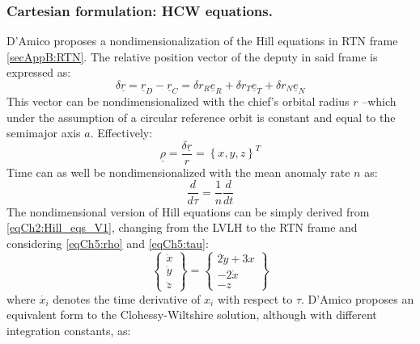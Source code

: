 		\subsubsection{Cartesian formulation: HCW equations.}
		\indent D'Amico proposes a nondimensionalization of the Hill equations in RTN frame \ref{secAppB:RTN}. The relative position vector of the deputy in said frame is expressed as:
		\[
		\delta \underline{r} = \underline{r}_D - \underline{r}_C = \delta r_R \underline{e}_R + \delta r_T \underline{e}_T + \delta r_N \underline{e}_N
		\]
		\indent This vector can be nondimensionalized with the chief's orbital radius $r$ --which under the assumption of a circular reference orbit is constant and equal to the semimajor axis $a$. Effectively:
		\begin{equation}
		\underline{\rho} = \dfrac{\delta \underline{r}}{r} = \left\{ x, y, z\right\}^T
		\label{eqCh5:rho}
		\end{equation}
		\indent Time can as well be nondimensionalized with the mean anomaly rate $n$ as:
		\begin{equation}
		\dfrac{d}{d\tau} = \dfrac{1}{n} \dfrac{d}{dt} 
		\label{eqCh5:tau}
		\end{equation}
		\indent The nondimensional version of Hill equations can be simply derived from \eqref{eqCh2:Hill_eqs_V1}, changing from the LVLH to the RTN frame and considering \eqref{eqCh5:rho} and \eqref{eqCh5:tau}:
		\begin{equation}
		\left\{
		\begin{array}{c}
		\ddot{x}\\
		\ddot{y}\\
		\ddot{z}
		\end{array}\right\}
		= 
		\left\{
		\begin{array}{c}
		2\dot{y} + 3 x \\
		-2 \dot{x} \\
		-z 
		\end{array}\right\}
		\label{eqCh5:Hill_eqs_RTN}
		\end{equation}
		\noindent where $\dot{x_i}$ denotes the time derivative of $x_i$ with respect to $\tau$. D'Amico proposes an equivalent form to the Clohessy-Wiltshire solution, although with different integration constants, as:
